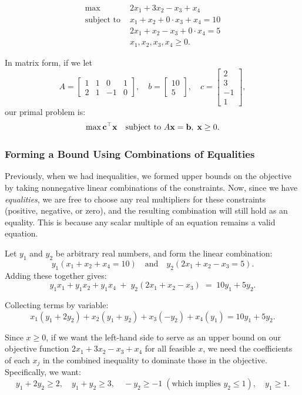 \[
\begin{aligned}
\max \; & 2x_1 + 3x_2 - x_3 + x_4 \\
\text{subject to } & x_1 + x_2 + 0 \cdot x_3 + x_4 = 10 \\
& 2x_1 + x_2 - x_3 + 0 \cdot x_4 = 5 \\
& x_1, x_2, x_3, x_4 \geq 0.
\end{aligned}
\]

In matrix form, if we let 
\[
A = \begin{bmatrix}
1 & 1 & 0 & 1 \\
2 & 1 & -1 & 0
\end{bmatrix}, \quad b = \begin{bmatrix}10 \\ 5\end{bmatrix}, \quad c = \begin{bmatrix}2 \\ 3 \\ -1 \\ 1\end{bmatrix},
\]
our primal problem is:
\[
\max \mathbf{c}^\top \mathbf{x} \quad\mbox{subject to } A \mathbf{x} = \mathbf{b}, \; \mathbf{x} \geq 0.
\]

\subsubsection*{Forming a Bound Using Combinations of Equalities}

Previously, when we had inequalities, we formed upper bounds on the objective by taking nonnegative linear combinations of the constraints. Now, since we have \emph{equalities}, we are free to choose any real multipliers for these constraints (positive, negative, or zero), and the resulting combination will still hold as an equality. This is because any scalar multiple of an equation remains a valid equation.

Let $y_1$ and $y_2$ be arbitrary real numbers, and form the linear combination:
\[
y_1 (x_1 + x_2 + x_4 = 10) \quad \text{and} \quad y_2 (2x_1 + x_2 - x_3 = 5).
\]
Adding these together gives:
\[
y_1 x_1 + y_1 x_2 + y_1 x_4 \;+\; y_2(2x_1 + x_2 - x_3) \;=\; 10y_1 + 5y_2.
\]

Collecting terms by variable:
\[
x_1(y_1 + 2y_2) + x_2(y_1 + y_2) + x_3(-y_2) + x_4(y_1) = 10y_1 + 5y_2.
\]

Since $x \geq 0$, if we want the left-hand side to serve as an upper bound on our objective function $2x_1 + 3x_2 - x_3 + x_4$ for all feasible $x$, we need the coefficients of each $x_j$ in the combined inequality to dominate those in the objective. Specifically, we want:
\[
y_1 + 2y_2 \geq 2, \quad y_1 + y_2 \geq 3, \quad -y_2 \geq -1 \;(\text{which implies } y_2 \leq 1), \quad y_1 \geq 1.
\]

